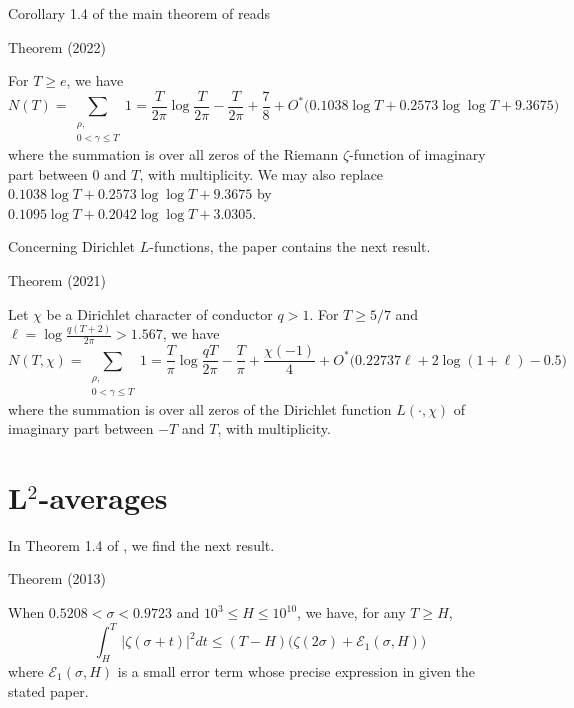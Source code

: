 Corollary 1.4 of the main theorem of
\cite{Hasanalizade-Shen-Wong*22}
reads
\begin{thm}{Theorem (2022)}

For $T\ge e$, we have
$$
N(T)=\sum_{\substack{\rho,\\ 0 < \gamma\le T}} 1=
            \frac{T}{2\pi}\log\frac{T}{2\pi}-\frac{T}{2\pi}+\frac{7}{8}
            +O^*\bigl(0.1038\log T+0.2573\log\log T+9.3675
            \bigr)
            $$
            where the summation is over all zeros of the Riemann
            $\zeta$-function of
				 imaginary part between 0 and $T$, with multiplicity.
				 We may also replace $0.1038\log
				 T+0.2573\log\log T+9.3675$ by $0.1095\log T+0.2042\log\log T+3.0305$.
\end{thm}



Concerning Dirichlet $L$-functions, the paper
\cite{Bennett-Martin-OBryant-Rechnitzer*21}
contains the next result.

\begin{thm}{Theorem (2021)}

    Let $\chi$ be a Dirichlet character of conductor $q > 1$.
For $T\ge 5/7$ and $\ell= \log\frac{q(T+2)}{2\pi} > 1.567$, we have
$$
N(T,\chi)=\sum_{\substack{\rho,\\ 0 < \gamma\le T}} 1=
            \frac{T}{\pi}\log\frac{qT}{2\pi}-\frac{T}{\pi}+\frac{\chi(-1)}{4}
            +O^*\bigl(0.22737\ell+2\log(1+\ell)-0.5
            \bigr)
            $$
            where the summation is over all zeros of the Dirichlet
            function $L(\cdot,\chi)$ of
				 imaginary part between $-T$ and $T$, with multiplicity.
				 
\end{thm}





\par 
\section{L${}^2$-averages}


In Theorem 1.4 of
\cite{Kadiri*13},
we find the next result.
\begin{thm}{Theorem (2013)}

    When $0.5208 < \sigma < 0.9723$ and $10^3\le H \le 10^{10}$,
    we have, for any $T\ge H$,
    $$
			    \int_H^T |\zeta(\sigma + t)|^2 dt
			    \le
			    (T-H) \bigl(\zeta(2\sigma) +
    \mathcal{E}_1(\sigma, H)\bigr)
			    $$
    where $\mathcal{E}_1(\sigma, H)$ is a small error term whose
    precise expression in given the stated paper.
\end{thm}



